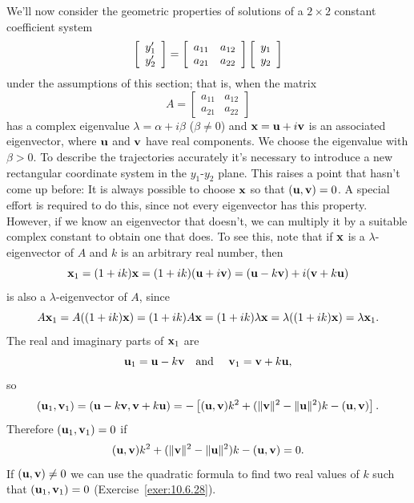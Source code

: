 
\noindent
We'll now consider the geometric properties of solutions of a $2\times2$ constant coefficient system
\begin{equation}
  \label{eq:10.6.10}\left[\begin{array}{l}y_{1}'\\y_{2}'\end{array}\right]=\left[
  \begin{array}{cc}
    a_{11} & a_{12} \\
    a_{21} & a_{22}
  \end{array}\right]\left[\begin{array}{l}y_{1}\\y_{2}\end{array}\right]
\end{equation}
under the assumptions of this section; that is, when the matrix
\[
  A=\left[
  \begin{array}{cc}
    a_{11} & a_{12} \\
    a_{21} & a_{22}
  \end{array}\right]
\]
has a complex eigenvalue $\lambda=\alpha+i\beta$ {\rm(}$\beta\ne0${\rm}) and
${\bf x}={\bf u}+i{\bf v}$ is an associated eigenvector, where ${\bf u}$ and ${\bf v}$ have real
components. We choose the eigenvalue with $\beta>0$.
To describe the trajectories accurately it's necessary to introduce a new rectangular
coordinate system in the $y_{1}$-$y_{2}$ plane. This raises a point that hasn't come up before: It
is always possible to choose ${\bf x}$ so that $({\bf u},{\bf v})=0$. A special effort is required
to do this, since not every eigenvector has this property. However, if we know an eigenvector that
doesn't, we can multiply it by a suitable complex constant to obtain one that does. To see this,
note that if ${\bf x}$ is a $\lambda$-eigenvector of $A$ and $k$ is an arbitrary real number, then
\[
  {\bf x}_{1}=(1+ik){\bf x}=(1+ik)({\bf u}+i{\bf v}) =({\bf u}-k{\bf v})+i({\bf v}+k{\bf u})
\]
is also a $\lambda$-eigenvector of $A$, since
\[
  A{\bf x}_{1}=A((1+ik){\bf x})=(1+ik)A{\bf x}=(1+ik)\lambda{\bf x}= \lambda((1+ik){\bf x})=\lambda{\bf x}_{1}.
\]
The real and imaginary parts of ${\bf x}_{1}$ are
\begin{equation}
  \label{eq:10.6.11}{\bf u}_{1}={\bf u}-k{\bf v}\mbox{\quad and \quad}{\bf v}_{1}={\bf v}+k{\bf u},
\end{equation}
so
\[
  ({\bf u}_{1},{\bf v}_{1})=({\bf u}-k{\bf v},{\bf v}+k{\bf u}) =-\left[({\bf u},{\bf v})k^{2}+(\|{\bf v}\|^{2}-\|{\bf u}\|^{2})k -({\bf u},{\bf v})\right].
\]
Therefore $({\bf u}_{1},{\bf v}_{1})=0$ if
\begin{equation}
  \label{eq:10.6.12}({\bf u},{\bf v})k^{2}+(\|{\bf v}\|^{2}-\|{\bf u}\|^{2})k-({\bf u},{\bf v})=0.
\end{equation}
If $({\bf u},{\bf v})\ne0$ we can use the quadratic formula to find two real values of $k$ such that
$({\bf u}_{1},{\bf v}_{1})=0$ (Exercise~\ref{exer:10.6.28}).


